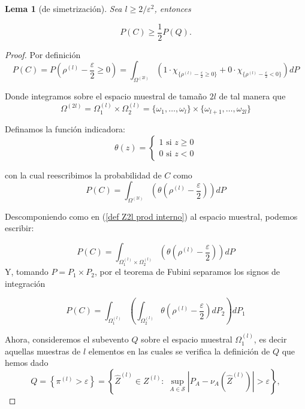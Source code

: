 \documentclass{report}
\newtheorem{lem}{Lema}[section]
\begin{document}
\begin{lem} [de simetrización]
    Sea \( l \geq 2 / \varepsilon^2 \), entonces

    \[
    P(C) \geq \frac{1}{2} P(Q).
    \]
\end{lem}
\begin{proof}
Por definición
\begin{equation*}
P(C) = P\left(\rho^{(l)}-\frac{\varepsilon}{2}\geq 0\right) = \int_{\Omega^{(2l)}} \left( 1 \cdot \chi_{\{\rho^{(l)}-\frac{\varepsilon}{2}\geq 0\}} + 
0 \cdot \chi_{\{\rho^{(l)}-\frac{\varepsilon}{2}< 0\}} \right) dP
\end{equation*}

Donde integramos sobre el espacio muestral de tamaño $2l$ de tal manera que
\begin{equation}
    \Omega^{(2l)} = \Omega_1^{(l)}\times \Omega_2^{(l)} = \{\omega_1,\ldots,\omega_l\} \times \{\omega_{l+1},\dots,\omega_{2l}\} \label{def Z2l prod interno}
\end{equation}


Definamos la función indicadora: 
\[
\theta(z)=\begin{cases}
    1 \text{ si } z\geq 0 \\
    0 \text{ si } z< 0
\end{cases}  
\]

con la cual reescribimos la probabilidad de $C$ como
\begin{equation}
P(C) = \int_{\Omega^{(2l)}} \left( \theta\left(\rho^{(l)}-\frac{\varepsilon}{2}\right)\right) dP
\end{equation}

Descomponiendo como en (\ref{def Z2l prod interno}) al espacio muestral, podemos escribir:

\[
P(C) = \int_{\Omega_1^{(l)}\times \Omega_2^{(l)}} \left( \theta\left(\rho^{(l)}-\frac{\varepsilon}{2}\right)\right) dP
\]
Y, tomando $P=P_1\times P_2$, por el teorema de Fubini separamos los signos de integración

\[
P(C) = \int_{\Omega_1^{(l)}} \left( \int_{ \Omega_2^{(l)}}  \theta\left(\rho^{(l)}-\frac{\varepsilon}{2}\right) dP_2\right) dP_1
\]

Ahora, consideremos el subevento $Q$ sobre el espacio muestral $\Omega_1^{(l)}$, es decir aquellas muestras de $l$
elementos en las cuales se verifica la definición de $Q$ que hemos dado
\[
Q = \left\{ \pi^{(l)} > \varepsilon \right\} = \left\{\hat{Z}^{(l)}\in Z^{(l)}:\; 
\sup_{A\in\mathcal{S}}\left|P_A - \nu_A\left(\hat{Z}^{(l)}\right)\right| > \varepsilon \right\},
\]


\end{proof}
\end{document}
